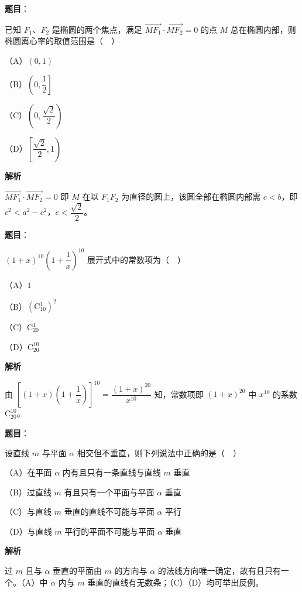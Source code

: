 \begin{answer}

\textbf{题目}：

已知 $F_1$、$F_2$ 是椭圆的两个焦点，满足 $\overrightarrow{MF_1}\cdot\overrightarrow{MF_2}=0$ 的点 $M$ 总在椭圆内部，则椭圆离心率的取值范围是（　）

（A）$(0,1)$

（B）$\left(0,\dfrac12\right]$

（C）$\left(0,\dfrac{\sqrt2}2\right)$

（D）$\left[\dfrac{\sqrt2}2,1\right)$

\textbf{解析}

$\overrightarrow{MF_1}\cdot\overrightarrow{MF_2}=0$ 即 $M$ 在以 $F_1F_2$ 为直径的圆上，该圆全部在椭圆内部需 $c<b$，即 $c^2<a^2-c^2$，$e<\dfrac{\sqrt2}2$。


\end{answer}
\begin{answer}

\textbf{题目}：

$(1+x)^{10}\left(1+\dfrac1x\right)^{10}$ 展开式中的常数项为（　）

（A）$1$

（B）$(\mathrm C_{10}^1)^2$

（C）$\mathrm C_{20}^1$

（D）$\mathrm C_{20}^{10}$

\textbf{解析}

由 $\left[(1+x)\left(1+\dfrac1x\right)\right]^{10}=\dfrac{(1+x)^{20}}{x^{10}}$ 知，常数项即 $(1+x)^{20}$ 中 $x^{10}$ 的系数 $\mathrm C_{20}^{10}$。


\end{answer}
\begin{answer}

\textbf{题目}：

设直线 $m$ 与平面 $\alpha$ 相交但不垂直，则下列说法中正确的是（　）

（A）在平面 $\alpha$ 内有且只有一条直线与直线 $m$ 垂直

（B）过直线 $m$ 有且只有一个平面与平面 $\alpha$ 垂直

（C）与直线 $m$ 垂直的直线不可能与平面 $\alpha$ 平行

（D）与直线 $m$ 平行的平面不可能与平面 $\alpha$ 垂直

\textbf{解析}

过 $m$ 且与 $\alpha$ 垂直的平面由 $m$ 的方向与 $\alpha$ 的法线方向唯一确定，故有且只有一个。（A）中 $\alpha$ 内与 $m$ 垂直的直线有无数条；（C）（D）均可举出反例。


\end{answer}
